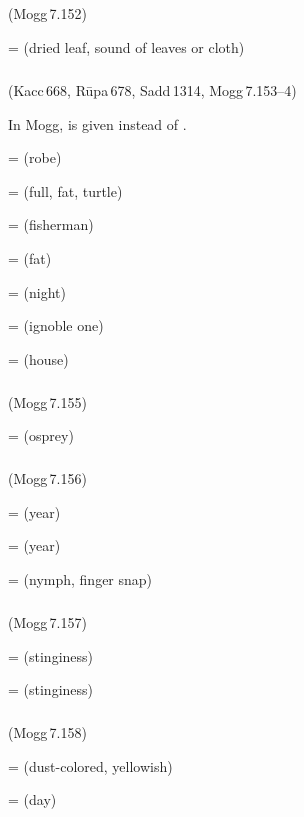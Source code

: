 \subparagraph*{} (Mogg\,7.152)\label{pacckx:mara}

 =  (dried leaf, sound of leaves or cloth)\par

\subparagraph*{} (Kacc\,668, R\=upa\,678, Sadd\,1314, Mogg\,7.153--4)\label{pacckx:iivara}\label{pacckx:kvara}

In Mogg,  is given instead of .

 =  (robe)\par
{} =  (full, fat, turtle)\par
{} =  (fisherman)\par
{} =  (fat)\par
{} =  (night)\par
{} =  (ignoble one)\par
{} =  (house)\par

\subparagraph*{} (Mogg\,7.155)\label{pacckx:krara}

 =  (osprey)\par

\subparagraph*{} (Mogg\,7.156)\label{pacckx:chara1}

 =  (year)\par
{} =  (year)\par
{} =  (nymph, finger snap)\par

\subparagraph*{} (Mogg\,7.157)\label{pacckx:chera}\label{pacckx:chara2}

 =  (stinginess)\par
{} =  (stinginess)\par

\subparagraph*{} (Mogg\,7.158)\label{pacckx:sara}

 =  (dust-colored, yellowish)\par
{} =  (day)\par

